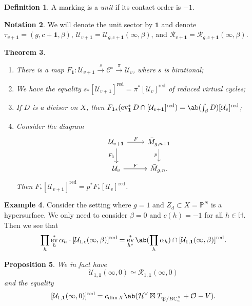 \documentclass{amsart}
\newtheorem{thm}{Theorem}[section]
\newtheorem{prop}[thm]{Proposition}
\theoremstyle{definition}
\newtheorem{defn}[thm]{Definition}
\newtheorem{exm}[thm]{Example}
\newtheorem{notn}[thm]{Notation}
\theoremstyle{remark}
\theoremstyle{plain}
\theoremstyle{definition}
\theoremstyle{remark}
\newcommand{\C}{\mathbb{C}}
\renewcommand{\H}{\mathbb{H}}
\renewcommand{\P}{\mathbb{P}}
\newcommand{\mc}[1]{\mathcal{#1}}
\newcommand{\mf}[1]{\mathfrak{#1}}
\newcommand{\mr}[1]{\mathrm{#1}}
\newcommand{\on}[1]{\operatorname{#1}}
\newcommand{\1}{\mathbf{1}}
\newcommand{\2}{\mathbf{2}}
\newcommand{\3}{\mathbf{3}}
\DeclareMathOperator{\ev}{ev}
\begin{document}
\begin{defn}
    A marking is a \textit{unit} if its contact order is \(-1\).
\end{defn}

\begin{notn}
    We will denote the unit sector by \(\1\) and denote \(\tau_{v+\1} = (g, c+\1, \beta)\), \(\mc{U}_{v+\1} = \mc{U}_{g, c+\1}(\infty, \beta)\), and \(\mc{R}_{v+\1} = \mc{R}_{g, c+\1}(\infty, \beta)\).
\end{notn}

\begin{thm}\leavevmode
    \begin{enumerate}
        \item There is a map \(F_{\1} \colon \mc{U}_{v+\1} \xrightarrow{s} \mc{C}^{\circ} \xrightarrow{\pi} \mc{U}_v\), where \(s\) is birational;
        \item We have the equality \(s_* [\mc{U}_{v+\1}]^{\on{red}} = \pi^* [\mc{U}_v]^{\on{red}}\) of reduced virtual cycles;
        \item If \(D\) is a divisor on \(X\), then \(F_{\1 *} (\ev_{\1}^* D \cap [\mc{U}_{v+\1}]^{\on{red}}) = \ab(\int_{\beta} D) [\mc{U}_v]^{\on{red}}\); 
        \item Consider the diagram
            \begin{equation*}
            \begin{tikzcd}
                \mc{U}_{v+\1} \ar{r}{F} \ar{d}[swap]{F_{\1}} & \bar{M}_{g,n+1} \ar{d}[swap]{p} \\
                \mc{U}_v \ar{r}{F} & \bar{M}_{g,n}.
            \end{tikzcd}
            \end{equation*}
            Then \(F_* [\mc{U}_{v+\1}]^{\on{red}} = p^* F_* [\mc{U}_v]^{\on{red}}\).
    \end{enumerate}
\end{thm}

\begin{exm}
    Consider the setting where \(g = 1\) and \(Z_d \subset X = \P^N\) is a hypersurface. We only need to consider \(\beta = 0\) and \(c(h) = -1\) for all \(h \in \H\). Then we see that
    \[ \prod_h \ev_h^* \alpha_h \cdot [\mc{U}_{1,c}(\infty,\beta)]^{\mr{red}} = \ev_{h^{\star}}^* \ab(\prod_h \alpha_h) \cap [\mc{U}_{1,\1}(\infty,\beta)]^{\on{red}}. \]
\end{exm}

\begin{prop}
    We in fact have
    \[ \mc{U}_{1,\1}(\infty, 0) \simeq \mc{R}_{1,\1}(\infty, 0) \]
    and the equality
    \[ [\mc{U}_{1,\1}(\infty, 0)]^{\on{red}} = c_{\dim X} \ab(\mc{H}^{\vee} \boxtimes T_{\mf{P}/B\C_{\omega}^{\times}} + \mc{O} - V). \]
\end{prop}
\end{document}

